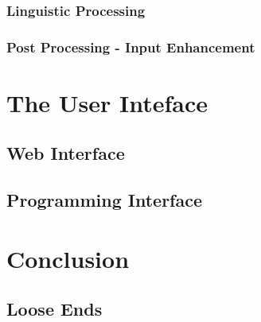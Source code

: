 \documentclass{article}
\begin{document}
\subsubsection{Linguistic Processing}

\subsubsection{Post Processing - Input Enhancement}

\section{The User Inteface}

\subsection{Web Interface}

\subsection{Programming Interface}

\section{Conclusion}

\subsection{Loose Ends}
\end{document}
